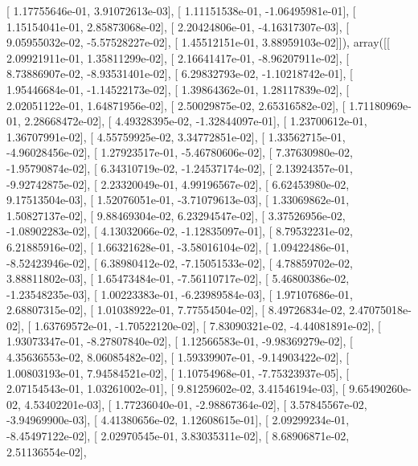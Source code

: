 \documentclass{article}
\begin{document}
       [  1.17755646e-01,   3.91072613e-03],
       [  1.11151538e-01,  -1.06495981e-01],
       [  1.15154041e-01,   2.85873068e-02],
       [  2.20424806e-01,  -4.16317307e-03],
       [  9.05955032e-02,  -5.57528227e-02],
       [  1.45512151e-01,   3.88959103e-02]]), array([[  2.09921911e-01,   1.35811299e-02],
       [  2.16641417e-01,  -8.96207911e-02],
       [  8.73886907e-02,  -8.93531401e-02],
       [  6.29832793e-02,  -1.10218742e-01],
       [  1.95446684e-01,  -1.14522173e-02],
       [  1.39864362e-01,   1.28117839e-02],
       [  2.02051122e-01,   1.64871956e-02],
       [  2.50029875e-02,   2.65316582e-02],
       [  1.71180969e-01,   2.28668472e-02],
       [  4.49328395e-02,  -1.32844097e-01],
       [  1.23700612e-01,   1.36707991e-02],
       [  4.55759925e-02,   3.34772851e-02],
       [  1.33562715e-01,  -4.96028456e-02],
       [  1.27923517e-01,  -5.46780606e-02],
       [  7.37630980e-02,  -1.95790874e-02],
       [  6.34310719e-02,  -1.24537174e-02],
       [  2.13924357e-01,  -9.92742875e-02],
       [  2.23320049e-01,   4.99196567e-02],
       [  6.62453980e-02,   9.17513504e-03],
       [  1.52076051e-01,  -3.71079613e-03],
       [  1.33069862e-01,   1.50827137e-02],
       [  9.88469304e-02,   6.23294547e-02],
       [  3.37526956e-02,  -1.08902283e-02],
       [  4.13032066e-02,  -1.12835097e-01],
       [  8.79532231e-02,   6.21885916e-02],
       [  1.66321628e-01,  -3.58016104e-02],
       [  1.09422486e-01,  -8.52423946e-02],
       [  6.38980412e-02,  -7.15051533e-02],
       [  4.78859702e-02,   3.88811802e-03],
       [  1.65473484e-01,  -7.56110717e-02],
       [  5.46800386e-02,  -1.23548235e-03],
       [  1.00223383e-01,  -6.23989584e-03],
       [  1.97107686e-01,   2.68807315e-02],
       [  1.01038922e-01,   7.77554504e-02],
       [  8.49726834e-02,   2.47075018e-02],
       [  1.63769572e-01,  -1.70522120e-02],
       [  7.83090321e-02,  -4.44081891e-02],
       [  1.93073347e-01,  -8.27807840e-02],
       [  1.12566583e-01,  -9.98369279e-02],
       [  4.35636553e-02,   8.06085482e-02],
       [  1.59339907e-01,  -9.14903422e-02],
       [  1.00803193e-01,   7.94584521e-02],
       [  1.10754968e-01,  -7.75323937e-05],
       [  2.07154543e-01,   1.03261002e-01],
       [  9.81259602e-02,   3.41546194e-03],
       [  9.65490260e-02,   4.53402201e-03],
       [  1.77236040e-01,  -2.98867364e-02],
       [  3.57845567e-02,  -3.94969900e-03],
       [  4.41380656e-02,   1.12608615e-01],
       [  2.09299234e-01,  -8.45497122e-02],
       [  2.02970545e-01,   3.83035311e-02],
       [  8.68906871e-02,   2.51136554e-02],
\end{document}

